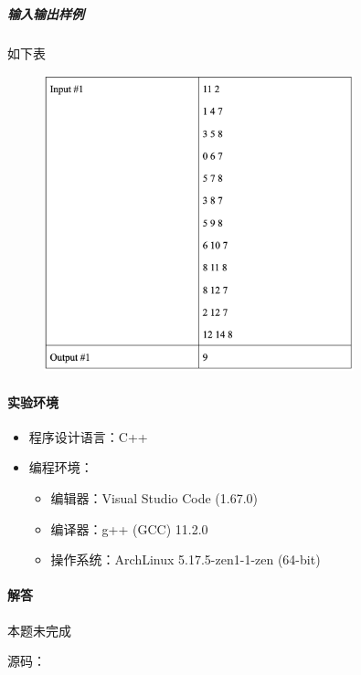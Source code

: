 \documentclass[12pt,a4paper]{ctexart}
\begin{document}
\subparagraph{输入输出样例}
如下表
    \begin{figure}[h]
        \centering
        \includegraphics[width=0.80\textwidth]{q1_iodata.png}
    \end{figure}

\vspace{5pt}

\paragraph{实验环境}
\begin{itemize}
    \item 程序设计语言：C++
    \item 编程环境：
    \begin{itemize}
        \item 编辑器：Visual Studio Code (1.67.0)
        \item 编译器：g++ (GCC) 11.2.0
        \item 操作系统：ArchLinux 5.17.5-zen1-1-zen (64-bit)
    \end{itemize}
\end{itemize}

\vspace{5pt}

\paragraph{解答} 本题未完成

源码：
\inputminted[bgcolor=codebg,frame=lines,autogobble,linenos=true,breaklines]{cpp}{src/t1.cpp}
\end{document}
